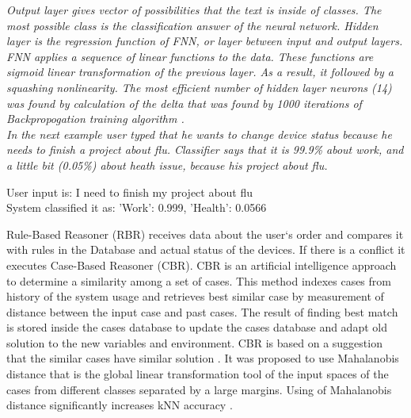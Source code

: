 \documentclass{llncs}
\begin{document}
    \em Output layer \em gives vector of possibilities that the text is inside of classes.
    The most possible class is the classification answer of the neural network.
    \em Hidden layer \em is the regression function of FNN, or layer between input and output layers.
    FNN applies a sequence of linear functions to the data.
    These functions are sigmoid linear transformation of the previous layer.
    As a result, it followed by a squashing nonlinearity.
    The most efficient number of hidden layer neurons (14) was found by calculation of the delta that was found by
    1000 iterations of Backpropogation training algorithm  \cite{14}.\\
    In the next example user typed that he wants to change device status because he needs to finish a project about flu.
    Classifier says that it is 99.9\% about work, and a little bit (0.05\%) about heath issue, because his project about flu.
    \begin{example}
        User input is: I need to finish my project about flu\\
        System classified it as: 'Work': 0.999, 'Health': 0.0566
    \end{example}
    Rule-Based Reasoner (RBR) receives data about the user`s order and compares it with rules in the Database and actual status of the devices.
    If there is a conflict it executes Case-Based Reasoner (CBR).
    CBR is an artificial intelligence approach to determine a similarity among a set of cases.
    This method indexes cases from history of the system usage and retrieves best similar case by measurement of distance between the input case and past cases.
    The result of finding best match is stored inside the cases database to update the cases database and adapt old solution to the new variables and environment.
    CBR is based on a suggestion that the similar cases have similar solution \cite{7}.
    It was proposed to use Mahalanobis distance that is the global linear transformation tool of the input spaces of the cases from different classes separated by a large margins.
    Using of Mahalanobis distance significantly increases kNN accuracy \cite{17}.
\end{document}
